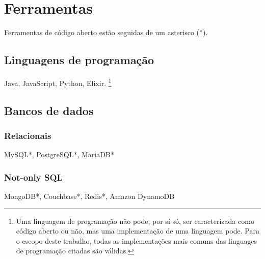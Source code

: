 \chapter{Ferramentas}\label{chapter-ferramentas}



Ferramentas de código aberto estão seguidas de um asterisco (*).

\section{Linguagens de programação}
Java, JavaScript, Python, Elixir. \footnote{Uma linguagem de programação não pode, por sí só, ser caracterizada como código aberto ou não, mas uma implementação de uma linguagem pode. Para o escopo deste trabalho, todas as implementações mais comuns das linguages de programação citadas são válidas.}


\section{Bancos de dados}

\subsection{Relacionais}
MySQL*, PostgreSQL*, MariaDB*

\subsection{Not-only SQL}
MongoDB*, Couchbase*, Redis*, Amazon DynamoDB

